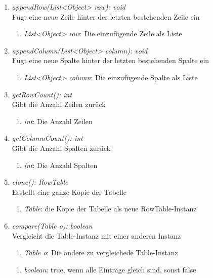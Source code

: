 \begin{enumerate}[+]
	\item \textit{appendRow(List<Object> row): void} \\
	Fügt eine neue Zeile hinter der letzten bestehenden Zeile ein
	\begin{enumerate}[$\bullet$]
		\item \textit{List<Object> row}: Die einzufügende Zeile als Liste
	\end{enumerate}
	\vspace{-0.2cm}
	
	\item \textit{appendColumn(List<Object> column): void} \\
	Fügt eine neue Spalte hinter der letzten bestehenden Spalte ein
	\begin{enumerate}[$\bullet$]
		\item \textit{List<Object> column}: Die einzufügende Spalte als Liste
	\end{enumerate}
	\vspace{-0.2cm}
	
	\item \textit{getRowCount(): int} \\
	Gibt die Anzahl Zeilen zurück
	\vspace{-0.2cm}
	\begin{enumerate}[$\circ$]
		\item \textit{int}: Die Anzahl Zeilen
	\end{enumerate}
	
	\item \textit{getColumnCount(): int} \\
	Gibt die Anzahl Spalten zurück
	\vspace{-0.2cm}
	\begin{enumerate}[$\circ$]
		\item \textit{int}: Die Anzahl Spalten
	\end{enumerate}
	
	\item \textit{clone(): RowTable} \\
	Erstellt eine ganze Kopie der Tabelle
	\vspace{-0.2cm}
	\begin{enumerate}[$\circ$]
		\item \textit{Table}: die Kopie der Tabelle als neue RowTable-Instanz
	\end{enumerate}
	
	\item \textit{compare(Table o): boolean} \\
	Vergleicht die Table-Instanz mit einer anderen Instanz
	\begin{enumerate}[$\bullet$]
		\item \textit{Table o}: Die andere zu vergleichede Table-Instanz
	\end{enumerate}
	\vspace{-0.2cm}
	\begin{enumerate}[$\circ$]
		\item \textit{boolean}: true, wenn alle Einträge gleich sind, sonst false
	\end{enumerate}
\end{enumerate}